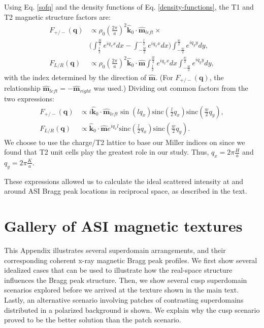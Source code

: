 \documentclass[aps, prb, reprint, showpacs, superscriptaddress]{revtex4-1}
\begin{document}
Using Eq. \ref{sofq} and the density functions of Eq. \ref{density-functions}, the T1 and T2 magnetic structure factors are:
\begin{align*}
F_{+/-}(\boldsymbol{q}) &\propto 
\rho_0 \left ( \frac{ 2 \pi }{ a } \right )^2 \boldsymbol{\hat{k}}_0 \cdot \boldsymbol{\hat{m}}_{left} \times \\
 & \bigg( 
\int_{ \frac{l}{2} }^{ \frac{3l}{2} } e^{ i q_x x } dx -
\int_{ -\frac{3l}{2} }^{ -\frac{l}{2} } e^{ i q_x x } dx 
\bigg) \int_{ -\frac{w}{2} }^{ \frac{w}{2} } e^{ i q_y y } dy,
\\
F_{L/R}(\boldsymbol{q}) &\propto 
\rho_0 \left ( \frac{ 2 \pi }{ a } \right )^2 \boldsymbol{\hat{k}}_0 \cdot \boldsymbol{\hat{m}}
\int_{ \frac{l}{2} }^{ \frac{3l}{2} } e^{ i q_x x } dx 
\int_{ -\frac{w}{2} }^{ \frac{w}{2} } e^{ i q_y y } dy,
\end{align*}
with the index determined by the direction of $\boldsymbol{\hat{m}}$.
(For $F_{+/-}(\boldsymbol{q})$, the relationship $\boldsymbol{\hat{m}}_{left} = -\boldsymbol{\hat{m}}_{right}$ was used.)
Dividing out common factors from the two expressions:
\begin{align*}
F_{+/-}(\boldsymbol{q}) &\propto 
i \boldsymbol{\hat{k}}_0 \cdot \boldsymbol{\hat{m}}_{left}
\sin( l q_x ) \text{sinc}( \frac{l}{2} q_x ) \text{sinc}( \frac{w}{2} q_y ),
\\
F_{L/R}(\boldsymbol{q}) &\propto 
\boldsymbol{\hat{k}}_0 \cdot \boldsymbol{\hat{m}}
e^{i q_x l} \text{sinc}( \frac{l}{2} q_x ) \text{sinc}( \frac{w}{2} q_y ).
\end{align*}
We choose to use the charge/T2 lattice to base our Miller indices on since we found that T2 unit cells play the greatest role in our study. 
Thus, $q_x = 2 \pi \frac{ H }{ a }$ and $q_y = 2 \pi \frac{ K }{ a }$.

These expressions allowed us to calculate the ideal scattered intensity at and around ASI Bragg peak locations in reciprocal space, as described in the text.

\section{Gallery of ASI magnetic textures}
\renewcommand{\thefigure}{\thesection} 

This Appendix illustrates several superdomain arrangements, and their corresponding coherent x-ray magnetic Bragg peak profiles.
We first show several idealized cases that can be used to illustrate how the real-space structure influences the Bragg peak structure.
Then, we show several cusp superdomain scenarios explored before we arrived at the texture shown in the main text.
Lastly, an alternative scenario involving patches of contrasting superdomains distributed in a polarized background is shown.
We explain why the cusp scenario proved to be the better solution than the patch scenario.
\end{document}

